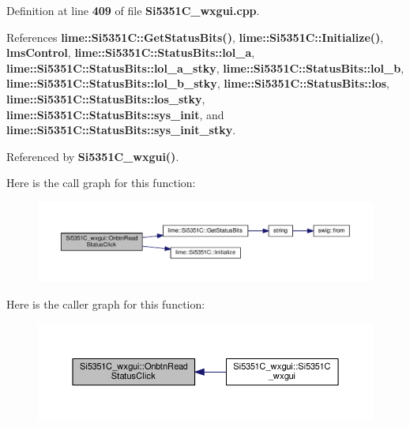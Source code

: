 Definition at line {\bf 409} of file {\bf Si5351\+C\+\_\+wxgui.\+cpp}.



References {\bf lime\+::\+Si5351\+C\+::\+Get\+Status\+Bits()}, {\bf lime\+::\+Si5351\+C\+::\+Initialize()}, {\bf lms\+Control}, {\bf lime\+::\+Si5351\+C\+::\+Status\+Bits\+::lol\+\_\+a}, {\bf lime\+::\+Si5351\+C\+::\+Status\+Bits\+::lol\+\_\+a\+\_\+stky}, {\bf lime\+::\+Si5351\+C\+::\+Status\+Bits\+::lol\+\_\+b}, {\bf lime\+::\+Si5351\+C\+::\+Status\+Bits\+::lol\+\_\+b\+\_\+stky}, {\bf lime\+::\+Si5351\+C\+::\+Status\+Bits\+::los}, {\bf lime\+::\+Si5351\+C\+::\+Status\+Bits\+::los\+\_\+stky}, {\bf lime\+::\+Si5351\+C\+::\+Status\+Bits\+::sys\+\_\+init}, and {\bf lime\+::\+Si5351\+C\+::\+Status\+Bits\+::sys\+\_\+init\+\_\+stky}.



Referenced by {\bf Si5351\+C\+\_\+wxgui()}.



Here is the call graph for this function\+:
\nopagebreak
\begin{figure}[H]
\begin{center}
\leavevmode
\includegraphics[width=350pt]{db/d2e/classSi5351C__wxgui_a0e0a6f527f721921acb695b55eb47c18_cgraph}
\end{center}
\end{figure}




Here is the caller graph for this function\+:
\nopagebreak
\begin{figure}[H]
\begin{center}
\leavevmode
\includegraphics[width=350pt]{db/d2e/classSi5351C__wxgui_a0e0a6f527f721921acb695b55eb47c18_icgraph}
\end{center}
\end{figure}


